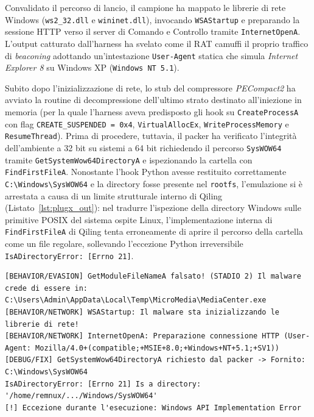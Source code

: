 \documentclass[11pt, a4paper]{article}
\begin{document}
Convalidato il percorso di lancio, il campione ha mappato le librerie di rete Windows (\texttt{ws2\_32.dll} e \texttt{wininet.dll}), invocando \texttt{WSAStartup} e preparando la sessione HTTP verso il server di Comando e Controllo tramite \texttt{Internet\allowbreak{}OpenA}. L'output catturato dall'harness ha svelato come il RAT camuffi il proprio traffico di \textit{beaconing} adottando un'intestazione \texttt{User-Agent} statica che simula \textit{Internet Explorer 8} su Windows XP (\texttt{Windows NT 5.1}).

Subito dopo l'inizializzazione di rete, lo stub del compressore \textit{PECompact2} ha avviato la routine di decompressione dell'ultimo strato destinato all'iniezione in memoria (per la quale l'harness aveva predisposto gli hook su \texttt{Create\allowbreak{}ProcessA} con flag \texttt{CREATE\_\allowbreak{}SUSPENDED = 0x4}, \texttt{Virtual\allowbreak{}Alloc\allowbreak{}Ex}, \texttt{Write\allowbreak{}Process\allowbreak{}Memory} e \texttt{ResumeThread}). Prima di procedere, tuttavia, il packer ha verificato l'integrit\`a dell'ambiente a 32 bit su sistemi a 64 bit richiedendo il percorso \texttt{SysWOW64} tramite \texttt{Get\allowbreak{}System\allowbreak{}Wow64\allowbreak{}DirectoryA} e ispezionando la cartella con \texttt{Find\allowbreak{}First\allowbreak{}FileA}. Nonostante l'hook Python avesse restituito correttamente \texttt{C:\textbackslash\allowbreak{}Windows\textbackslash\allowbreak{}SysWOW64} e la directory fosse presente nel \texttt{rootfs}, l'emulazione si \`e arrestata a causa di un limite strutturale interno di Qiling (Listato~\ref{lst:plugx_out}): nel tradurre l'ispezione della directory Windows sulle primitive POSIX del sistema ospite Linux, l'implementazione interna di \texttt{Find\allowbreak{}First\allowbreak{}FileA} di Qiling tenta erroneamente di aprire il percorso della cartella come un file regolare, sollevando l'eccezione Python irreversibile \texttt{IsADirectory\allowbreak{}Error: [Errno 21]}.


\noindent\begin{minipage}{\linewidth}
\begin{lstlisting}[style=consoleout, caption={Traccia di esecuzione dello Stadio 2 di PlugX: path spoofing, cattura User-Agent C2 ed eccezione su SysWOW64.}, label={lst:plugx_out}]
[BEHAVIOR/EVASION] GetModuleFileNameA falsato! (STADIO 2) Il malware crede di essere in: C:\Users\Admin\AppData\Local\Temp\MicroMedia\MediaCenter.exe
[BEHAVIOR/NETWORK] WSAStartup: Il malware sta inizializzando le librerie di rete!
[BEHAVIOR/NETWORK] InternetOpenA: Preparazione connessione HTTP (User-Agent: Mozilla/4.0+(compatible;+MSIE+8.0;+Windows+NT+5.1;+SV1))
[DEBUG/FIX] GetSystemWow64DirectoryA richiesto dal packer -> Fornito: C:\Windows\SysWOW64
IsADirectoryError: [Errno 21] Is a directory: '/home/remnux/.../Windows/SysWOW64'
[!] Eccezione durante l'esecuzione: Windows API Implementation Error
\end{lstlisting}
\end{minipage}
\end{document}
